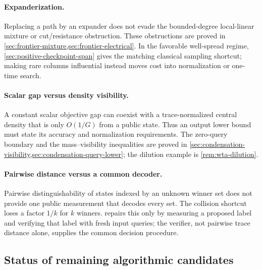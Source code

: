 \paragraph{Expanderization.}
Replacing a path by an expander does not evade the bounded-degree
local-linear mixture or cut/resistance obstruction.  These obstructions are
proved in \cref{sec:frontier-mixture,sec:frontier-electrical}.  In the favorable
well-spread regime, \cref{sec:positive-checkpoint-span} gives the matching
classical sampling shortcut; making rare columns influential instead moves
cost into normalization or one-time search.

\paragraph{Scalar gap versus density visibility.}
A constant scalar objective gap can coexist with a trace-normalized central
density that is only $O(1/G)$ from a public state.  Thus an output lower bound
must state its accuracy and normalization requirements.  The zero-query boundary
and the mass--visibility inequalities are proved in
\cref{sec:condensation-visibility,sec:condensation-query-lower}; the dilution
example is \cref{rem:wta-dilution}.

\paragraph{Pairwise distance versus a common decoder.}
Pairwise distinguishability of states indexed by an unknown winner set does
not provide one public measurement that decodes every set.  The collision
shortcut loses a factor $1/k$ for $k$ winners.  
repairs this only by measuring a proposed label and verifying that label with
fresh input queries; the verifier, not pairwise trace distance alone, supplies
the common decision procedure.

\subsection{Status of remaining algorithmic candidates}
\label{sec:corrections-dispositions}

